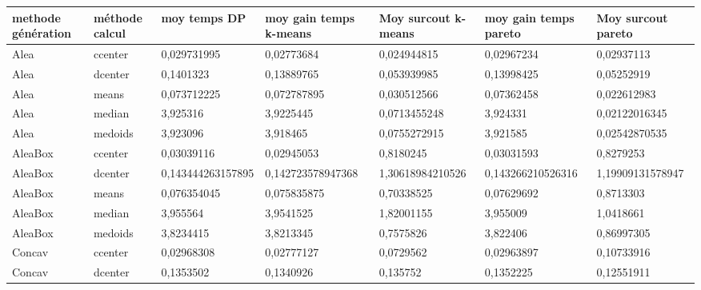 ﻿\documentclass{meta}
\begin{document}
{\begin{table}[]
\begin{adjustwidth}{-3cm}{}
\begin{tabular}{|l|l|l|l|l|l|l|}
\hline
methode génération & méthode calcul & moy temps DP      & moy gain temps k-means & Moy surcout k-means & moy gain temps pareto & Moy surcout pareto \\ \hline
Alea               & ccenter        & 0,029731995       & 0,02773684             & 0,024944815         & 0,02967234            & 0,02937113         \\ \hline
Alea               & dcenter        & 0,1401323         & 0,13889765             & 0,053939985         & 0,13998425            & 0,05252919         \\ \hline
Alea               & means          & 0,073712225       & 0,072787895            & 0,030512566         & 0,07362458            & 0,022612983        \\ \hline
Alea               & median         & 3,925316          & 3,9225445              & 0,0713455248        & 3,924331              & 0,02122016345      \\ \hline
Alea               & medoids        & 3,923096          & 3,918465               & 0,0755272915        & 3,921585              & 0,02542870535      \\ \hline
AleaBox            & ccenter        & 0,03039116        & 0,02945053             & 0,8180245           & 0,03031593            & 0,8279253          \\ \hline
AleaBox            & dcenter        & 0,143444263157895 & 0,142723578947368      & 1,30618984210526    & 0,143266210526316     & 1,19909131578947   \\ \hline
AleaBox            & means          & 0,076354045       & 0,075835875            & 0,70338525          & 0,07629692            & 0,8713303          \\ \hline
AleaBox            & median         & 3,955564          & 3,9541525              & 1,82001155          & 3,955009              & 1,0418661          \\ \hline
AleaBox            & medoids        & 3,8234415         & 3,8213345              & 0,7575826           & 3,822406              & 0,86997305         \\ \hline
Concav             & ccenter        & 0,02968308        & 0,02777127             & 0,0729562           & 0,02963897            & 0,10733916         \\ \hline
Concav             & dcenter        & 0,1353502         & 0,1340926              & 0,135752            & 0,1352225             & 0,12551911         \\ \hline

\end{tabular}
\end{adjustwidth}
\end{table}}
\end{document}
